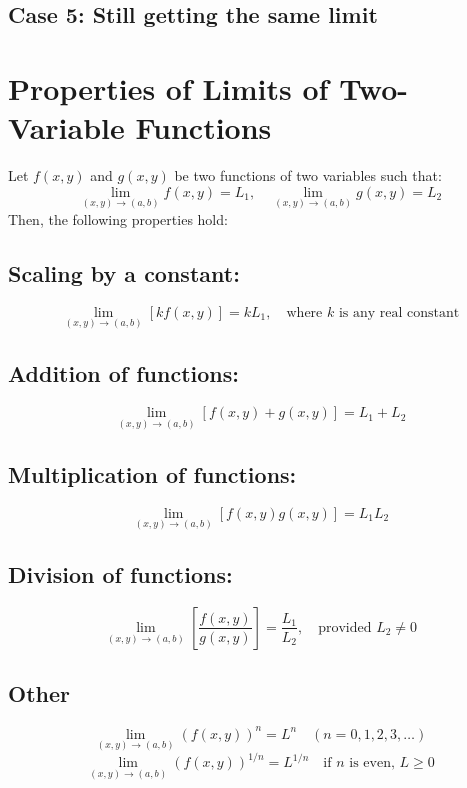 \documentclass{report}
\begin{document}
\subsection{Case 5: Still getting the same limit}



\section{Properties of Limits of Two-Variable Functions}

Let $f(x, y)$ and $g(x, y)$ be two functions of two variables such that:
\[
	\lim_{(x, y) \to (a, b)} f(x, y) = L_1, \quad \lim_{(x, y) \to (a, b)} g(x, y) = L_2
\]
Then, the following properties hold:

\subsection{Scaling by a constant:}
\[
	\lim_{(x, y) \to (a, b)} [k f(x, y)] = k L_1, \quad \text{where } k \text{ is any real constant}
\]

\subsection{Addition of functions:}
\[
	\lim_{(x, y) \to (a, b)} [f(x, y) + g(x, y)] = L_1 + L_2
\]

\subsection{Multiplication of functions:}
\[
	\lim_{(x, y) \to (a, b)} [f(x, y) g(x, y)] = L_1 L_2
\]

\subsection{Division of functions:}
\[
	\lim_{(x, y) \to (a, b)} \left[ \frac{f(x, y)}{g(x, y)} \right] = \frac{L_1}{L_2}, \quad \text{provided } L_2 \neq 0
\]

\subsection{Other}

\[
	\lim_{(x,y) \to (a,b)} \left( f(x,y) \right)^n = L^n \quad (n = 0,1,2,3,\dots)
\]
\[
	\lim_{(x,y) \to (a,b)} \left( f(x,y) \right)^{1/n} = L^{1/n} \quad \text{if } n \text{ is even, } L \geq 0
\]
\end{document}
